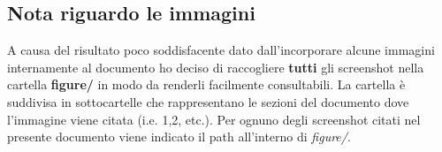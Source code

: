 \subsection{Nota riguardo le immagini}
A causa del risultato poco soddisfacente dato dall'incorporare alcune immagini internamente al documento ho deciso di raccogliere \textbf{tutti} gli screenshot nella cartella \textbf{figure/} in modo da renderli facilmente consultabili. La cartella
è suddivisa in sottocartelle che rappresentano le sezioni del documento dove 
l'immagine viene citata (i.e. 1,2, etc.). 
Per ognuno degli screenshot citati nel presente documento viene indicato il path all'interno di \textit{figure/}.
